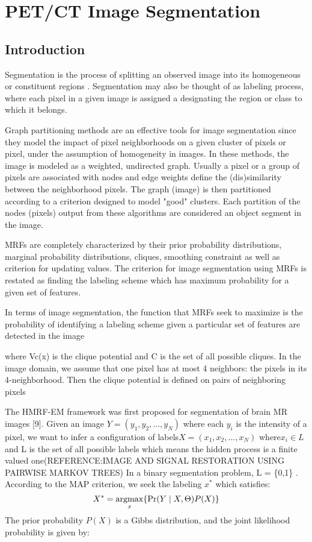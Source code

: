 \section{PET/CT Image Segmentation}

\subsection{Introduction}
Segmentation is the process of splitting an observed image into its homogeneous or constituent regions . Segmentation may also be thought of as labeling process, where each pixel in a given image is assigned a designating the region or class to which it belongs.

Graph partitioning methods are an effective tools for image segmentation since they model the impact of pixel neighborhoods on a given cluster of pixels or pixel, under the assumption of homogeneity in images. In these methods, the image is modeled as a weighted, undirected graph. Usually a pixel or a group of pixels are associated with nodes and edge weights define the (dis)similarity between the neighborhood pixels. The graph (image) is then partitioned according to a criterion designed to model "good" clusters. Each partition of the nodes (pixels) output from these algorithms are considered an object segment in the image.\par
MRFs are completely characterized by their prior probability distributions, marginal probability distributions, cliques, smoothing constraint as well as criterion for updating values. The criterion for image segmentation using MRFs is restated as finding the labeling scheme which has maximum probability for a given set of features. \par

In terms of image segmentation, the function that MRFs seek to maximize is the probability of identifying a labeling scheme given a particular set of features are detected in the image




where Vc(x) is the clique potential and C is the set of all possible cliques. In the image domain, we assume that one pixel has at most 4 neighbors: the pixels in its 4-neighborhood. Then the clique potential is defined on pairs of neighboring pixels

The HMRF-EM framework was first proposed for segmentation of brain MR images [9]. Given an image \(Y=(y_1, y_2,..., y_N)\) where each \(y_i\) is the intensity of a pixel, we want to infer a configuration of labels\(X = (x_1,x_2,...,x_N)\) where\(x_i \in L\)  and L is the set of all possible labels which means the hidden process is a finite valued one(REFERENCE:IMAGE AND SIGNAL RESTORATION USING PAIRWISE MARKOV TREES) In a binary segmentation problem, L = \{0,1\} . According to the MAP criterion, we seek the labeling \(x^*\) which satisfies:
\begin{equation}
X^*=\operatorname*{argmax}_x\{\Pr( Y \mid X, \Theta)P(X)\} 
\end{equation}
The prior probability \(P(X)\) is a Gibbs distribution, and the joint likelihood probability is given by:

